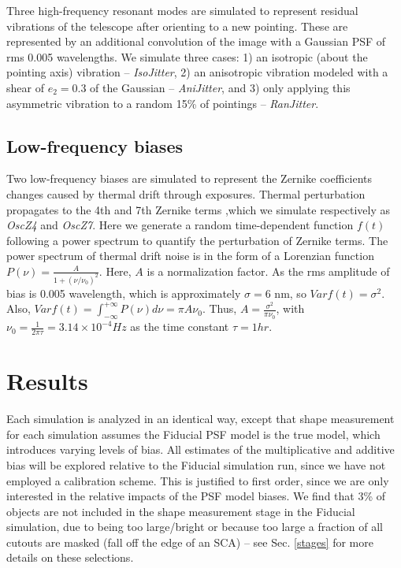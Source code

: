 \documentclass[aps,prd, amsmath,amssymb,superscriptaddress,showkeys,nofootinbib,reprint,preprintnumbers]{revtex4-1}
\begin{document}
Three high-frequency resonant modes are simulated to represent residual vibrations of the telescope after orienting to a new pointing. 
These are represented by an additional convolution of the image with a Gaussian PSF of rms 0.005 wavelengths. We simulate three cases: 1) an isotropic (about the pointing axis) vibration  -- \emph{IsoJitter}, 2) an anisotropic vibration modeled with a shear of $e_2=0.3$ of the Gaussian  -- \emph{AniJitter}, and 3) only applying this asymmetric vibration to a random 15\% of pointings  -- \emph{RanJitter}.

\subsection{Low-frequency biases}\label{sec:high}

Two low-frequency biases are simulated to represent the Zernike coefficients changes caused by thermal drift through exposures. Thermal perturbation propagates to the 4th and 7th Zernike terms ,which we simulate respectively as \emph{OscZ4} and \emph{OscZ7}.
Here we generate a random time-dependent function $f(t)$ following a power spectrum to quantify  the perturbation of Zernike terms. The power spectrum of thermal drift noise is in the form of a Lorenzian function $P(\nu)=\frac{A}{1+(\nu/\nu_0)^2}$. Here, $A$ is a normalization factor. As the rms amplitude of bias is 0.005 wavelength, which is approximately $\sigma=$6 nm, so $Var f(t) = \sigma^2 $. Also, $Var f(t)=\int_{-\infty}^{+\infty}P(\nu)d\nu=\pi A\nu_0$. Thus, $A=\frac{\sigma^2}{\pi\nu_0}$, with $\nu_0=\frac{1}{2\pi\tau}=3.14\times10^{-4}Hz$ as the time constant $\tau=1hr$. 
\section{Results}\label{sec:results}

Each simulation is analyzed in an identical way, except that shape measurement for each simulation assumes the Fiducial PSF model is the true model, which introduces varying levels of bias. 
All estimates of the multiplicative and additive bias will be explored relative to the Fiducial simulation run, since we have not employed a calibration scheme. 
This is justified to first order, since we are only interested in the relative impacts of the PSF model biases.
We find that 3\% of objects are not included in the shape measurement stage in the Fiducial simulation, due to being too large/bright or because too large a fraction of all cutouts are masked (fall off the edge of an SCA) -- see Sec. \ref{stages} for more details on these selections. 
\end{document}
